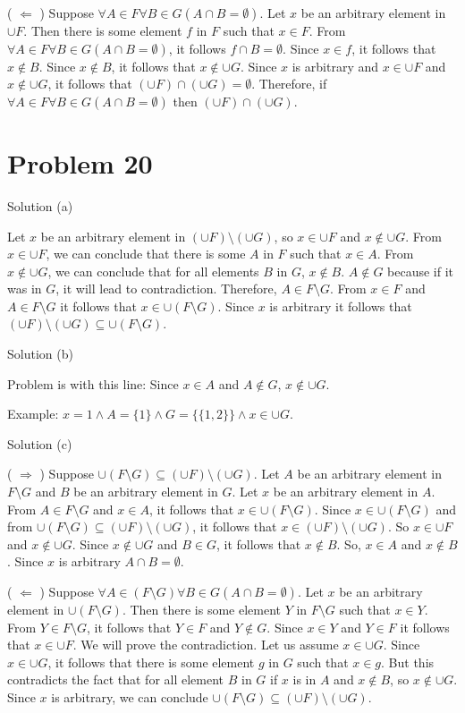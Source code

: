 \documentclass{article}
\begin{document}
( $\Leftarrow$ ) Suppose $\forall A \in F \forall B \in G (A \cap B =
\emptyset)$. Let $x$ be an arbitrary element in $\cup F$. Then there
is some element $f$ in $F$ such that $x \in F$. From $\forall A \in F
\forall B \in G (A \cap B = \emptyset)$, it follows $f \cap B =
\emptyset$. Since $x \in f$, it follows that $x \notin B$. Since $x
\notin B$, it follows that $x \notin \cup G$. Since $x$ is arbitrary
and $x \in \cup F$ and $x \notin \cup G$, it follows that $(\cup F)
\cap (\cup G) = \emptyset$. Therefore, if $\forall A \in F \forall B
\in G (A \cap B = \emptyset)$ then $(\cup F) \cap (\cup G)$.

\section{Problem 20}

Solution (a)

Let $x$ be an arbitrary element in $(\cup F) \setminus (\cup G)$, so
$x \in \cup F$ and $x \notin \cup G$. From $x \in \cup F$, we can
conclude that there is some $A$ in $F$ such that $x \in A$. From $x
\notin \cup G$, we can conclude that for all elements $B$ in $G$, $x
\notin B$. $A \notin G$ because if it was in $G$, it will lead to
contradiction. Therefore, $A \in F \setminus G$. From $x \in F$ and $A
\in F \setminus G$ it follows that $x \in \cup (F \setminus G)$. Since
$x$ is arbitrary it follows that $(\cup F) \setminus (\cup G)
\subseteq \cup (F \setminus G)$.

Solution (b)

Problem is with this line: Since $x \in A$ and $A \notin G$, $x \notin
\cup G$.

Example: $x = 1 \land A = \{1\} \land G = \{\{1,2\}\} \land x
\in \cup G$.

Solution (c)

( $\Rightarrow$ ) Suppose $\cup(F \setminus G) \subseteq (\cup F)
\setminus (\cup G)$. Let $A$ be an arbitrary element in $F \setminus
G$ and $B$ be an arbitrary element in $G$. Let $x$ be an arbitrary
element in $A$. From $A \in F \setminus G$ and $x \in A$, it follows
that $x \in \cup (F \setminus G)$. Since $x \in \cup(F \setminus G)$
and from $\cup(F \setminus G) \subseteq (\cup F) \setminus (\cup G)$,
it follows that $x \in (\cup F) \setminus (\cup G)$. So $x \in \cup F$
and $x \notin \cup G$. Since $x \notin \cup G$ and $B \in G$, it
follows that $x \notin B$. So, $x \in A$ and $x \notin B$. Since $x$
is arbitrary $A \cap B = \emptyset$.

( $\Leftarrow$ ) Suppose $\forall A \in (F \setminus G) \forall B \in
G(A \cap B = \emptyset)$. Let $x$ be an arbitrary element in $\cup(F
\setminus G)$. Then there is some element $Y$ in $F \setminus G$ such
that $x \in Y$. From $Y \in F \setminus G$, it follows that $Y \in F$
and $Y \notin G$. Since $x \in Y$ and $Y \in F$ it follows that $x \in
\cup F$. We will prove the contradiction. Let us assume $x \in \cup
G$. Since $x \in \cup G$, it follows that there is some element $g$ in
$G$ such that $x \in g$. But this contradicts the fact that for all
element $B$ in $G$ if $x$ is in $A$ and $x \notin B$, so $x \notin \cup
G$. Since $x$ is arbitrary, we can conclude $\cup (F \setminus G)
\subseteq (\cup F) \setminus (\cup G)$.
\end{document}
